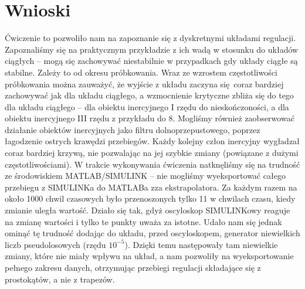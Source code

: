 \documentclass[a4paper, 12pt]{article}
\begin{document}
	\section{Wnioski}
		Ćwiczenie to pozwoliło nam na zapoznanie się z dyskretnymi układami regulacji. Zapoznaliśmy się na praktycznym przykładzie z ich wadą w stosunku do układów ciągłych -- mogą się zachowywać niestabilnie w przypadkach gdy układy ciągłe są stabilne. Zależy to od okresu próbkowania.
		\newline
		\newline
		Wraz ze wzrostem częstotliwości próbkowania można zauważyć, że wyjście z układu zaczyna się coraz bardziej zachowywać jak dla układu ciągłego, a wzmocnienie krytyczne zbliża się do tego dla układu ciągłego -- dla obiektu inercyjnego I rzędu do nieskończoności, a dla obiektu inercyjnego III rzędu z przykładu do 8.
		\newline 
		\newline
		Mogliśmy również zaobserwować działanie obiektów inercyjnych jako filtru dolnoprzepustowego, poprzez łagodzenie ostrych krawędzi przebiegów. Każdy kolejny człon inercyjny wygładzał coraz bardziej krzywą, nie pozwalając na jej szybkie zmiany (powiązane z dużymi częstotliwościami).
		\newline 
		\newline
		W trakcie wykonywania ćwiczenia natknęliśmy się na trudność ze środowiskiem \linebreak MATLAB/SIMULINK -- nie mogliśmy wyeksportować całego przebiegu z SIMULINKa do MATLABa zza ekstrapolatora. Za każdym razem na około 1000 chwil czasowych było przenoszonych tylko 11 w chwilach czasu, kiedy zmianie uległa wartość. Działo się tak, gdyż oscyloskop SIMULINKowy reaguje na zmianę wartości i tylko te punkty uważa za istotne. Udało nam się jednak ominąć tę trudność dodając do układu, przed oscyloskopem, generator niewielkich liczb pseudolosowych (rzędu $10^{-5}$). Dzięki temu następowały tam niewielkie zmiany, które nie miały wpływu na układ, a nam pozwoliły na wyeksportowanie pełnego zakresu danych, otrzymując przebiegi regulacji składające się z prostokątów, a nie z trapezów.
\end{document}
